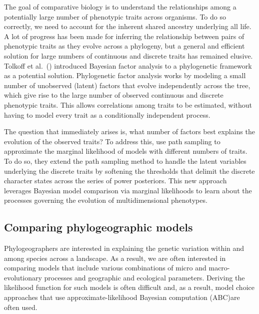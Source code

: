 The goal of comparative biology is to understand the relationships among a
potentially large number of phenotypic traits across organisms. 
To do so correctly, we need to account for the inherent shared ancestry
underlying all life\citep{Felsenstein1985PIC}.
A lot of progress has been made for inferring the relationship between pairs
of phenotypic traits as they evolve across a phylogeny,
but a general and efficient solution for large numbers of continuous
and discrete traits has remained elusive.
Tolkoff et al.\ (\citeyear{Tolkoff2017}) introduced Bayesian factor analysis to
a phylogenetic framework as a potential solution.
Phylogenetic factor analysis works by modeling a small number of unobserved
(latent) factors that evolve independently across the tree, which give rise to
the large number of observed continuous and discrete phenotypic traits.
This allows correlations among traits to be estimated, without having to model
every trait as a conditionally independent process.

The question that immediately arises is, what number of factors best explains
the evolution of the observed traits?
To address this, \citep{Tolkoff2017} use path sampling to approximate the
marginal likelihood of models with different numbers of traits.
To do so, they extend the path sampling method to handle the latent variables
underlying the discrete traits by softening the thresholds that delimit the
discrete character states across the series of power posteriors.
This new approach leverages Bayesian model comparison via marginal likelihoods
to learn about the processes governing the evolution of multidimensional
phenotypes.


\subsection{Comparing phylogeographic models}

Phylogeographers are interested in explaining the genetic variation within and
among species across a landscape.
As a result, we are often interested in comparing models that include
various combinations of micro and macro-evolutionary processes and geographic
and ecological parameters.
Deriving the likelihood function for such models is often difficult and, as a
result, model choice approaches that use approximate-likelihood Bayesian
computation (ABC)are often used.

